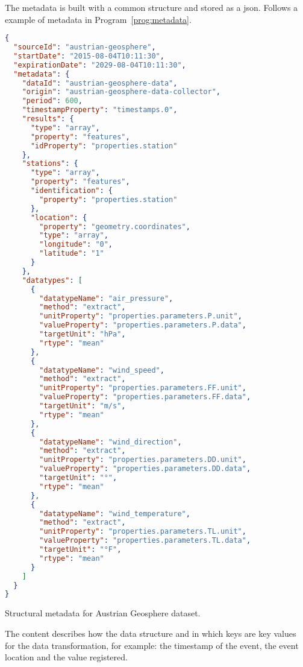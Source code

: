 The metadata is built with a common structure and stored as a json. Follows a example of metadata in Program~\ref{prog:metadata}.

\begin{program}
    \centering
  
  \begin{lstlisting}[language=JSON, style=wider]
{
  "sourceId": "austrian-geosphere",
  "startDate": "2015-08-04T10:11:30",
  "expirationDate": "2029-08-04T10:11:30",
  "metadata": {
    "dataId": "austrian-geosphere-data",
    "origin": "austrian-geosphere-data-collector",
    "period": 600,
    "timestampProperty": "timestamps.0",
    "results": {
      "type": "array",
      "property": "features",
      "idProperty": "properties.station"
    },
    "stations": {
      "type": "array",
      "property": "features",
      "identification": {
        "property": "properties.station"
      },
      "location": {
        "property": "geometry.coordinates",
        "type": "array",
        "longitude": "0",
        "latitude": "1"
      }
    },
    "datatypes": [
      {
        "datatypeName": "air_pressure",
        "method": "extract",
        "unitProperty": "properties.parameters.P.unit",
        "valueProperty": "properties.parameters.P.data",
        "targetUnit": "hPa",
        "rtype": "mean"
      },
      {
        "datatypeName": "wind_speed",
        "method": "extract",
        "unitProperty": "properties.parameters.FF.unit",
        "valueProperty": "properties.parameters.FF.data",
        "targetUnit": "m/s",
        "rtype": "mean"
      },
      {
        "datatypeName": "wind_direction",
        "method": "extract",
        "unitProperty": "properties.parameters.DD.unit",
        "valueProperty": "properties.parameters.DD.data",
        "targetUnit": "°",
        "rtype": "mean"
      },
      {
        "datatypeName": "wind_temperature",
        "method": "extract",
        "unitProperty": "properties.parameters.TL.unit",
        "valueProperty": "properties.parameters.TL.data",
        "targetUnit": "°F",
        "rtype": "mean"
      }
    ]
  }
}
  \end{lstlisting}
  
    \caption{Structural metadata for Austrian Geosphere dataset.\label{prog:metadata}}
\end{program}

The content describes how the data structure and in which keys are key values for the data transformation, for example: the timestamp of the event, the event location and the value registered.


